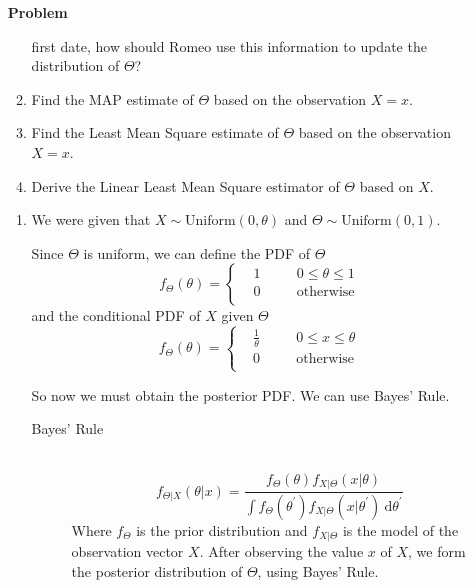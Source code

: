 \documentclass[12pt]{article}
\newenvironment{Ex}{\textbf{Problem}\vspace{.75em}\\}{}
\newcommand{\dd}[1]{\:\mathrm{d}{#1}}
\begin{document}
\begin{enumerate}
\begin{Ex}
\begin{enumerate}
      first date, how should Romeo use this information to update the
      distribution of $\Theta$?
    \item Find the MAP estimate of $\Theta$ based on the observation
      $X = x$.
    \item Find the Least Mean Square estimate of $\Theta$ based on the
      observation $X = x$.
    \item Derive the Linear Least Mean Square estimator of $\Theta$
      based on $X$.
    \end{enumerate}
    \begin{solution} \hfill
      \begin{enumerate}
      \item We were given that $X\sim\text{Uniform}(0,\theta)$ and
        $\Theta\sim\text{Uniform}(0,1)$.

        Since $\Theta$ is uniform, we can define the PDF of $\Theta$
        \begin{equation}
          \label{eq:4a-pdf-theta}
          f_\Theta(\theta)=\left\{
            \begin{aligned}
              & 1 &&\quad 0\le\theta\le1 \\
              & 0 &&\quad \text{otherwise} \\
            \end{aligned}\right.
        \end{equation}
        and the conditional PDF of $X$ given $\Theta$
        \begin{equation}
          \label{eq:4a-pdf-x-given-theta}
          f_\Theta(\theta)=\left\{
            \begin{aligned}
              & \frac{1}{\theta} &&\quad 0\le x \le\theta \\
              & 0 &&\quad \text{otherwise} \\
            \end{aligned}\right.
        \end{equation}

        So now we must obtain the posterior PDF. We can use Bayes'
        Rule.

        \begin{mdframed}[backgroundcolor=silver]
          \begin{description}
          \item[Bayes' Rule] \hfill \\
            $$f_{\Theta|X}(\theta|x) =
            \frac{f_{\Theta}(\theta)f_{X|\Theta}(x|\theta)} {\int
              f_{\Theta}(\theta^{\prime})f_{X|\Theta}(x|\theta^{\prime})
              \dd{\theta^{\prime}}}$$
            Where $f_{\Theta}$ is the prior distribution and
            $f_{X|\Theta}$ is the model of the observation vector
            $X$. After observing the value $x$ of $X$, we form the
            posterior distribution of $\Theta$, using Bayes' Rule.
          \end{description}
        \end{mdframed}


\end{enumerate}
\end{solution}
\end{Ex}
\end{enumerate}
\end{document}
